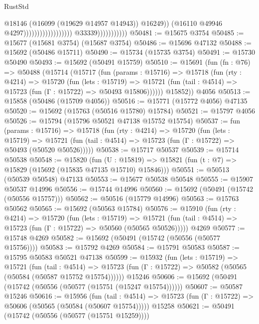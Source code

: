 \begin{lexlean}{RustStd}
\begin{coremodule}
                                                                @18146
                                                                (@16099 (@19629 @14957 @14943))
                                                                @16249))
                                                            (@16110 @49946 @4297))))))))))))))))))
                          @33339)))))))))))
@50481 := @15675 @3754
@50485 := @15677 (@15681 @3754) (@15687 @3754)
@50486 := @15696 @47132
@50488 := @15692 (@50486 @15711)
@50490 := @15734 (@15735 @3754)
@50491 := @15730 @50490
@50493 := @15692 (@50491 @15759)
@50510 := @15691
    (fun (fn : @76) =>
    @50488
      (@15714
        (@15717
          (fun (params : @15716) =>
          @15718
            (fun (rty : @4214) =>
            @15720
              (fun (lets : @15719) =>
              @15721 (fun (tail : @4514) => @15723 (fun (Γ : @15722) => @50493 @15806))))))
        @15852))
    @4056
@50513 := @15858 (@50486 (@15709 @4056))
@50516 := @15771 (@15772 @4056) @47135
@50520 := @15692 (@15763 (@50516 @15780) @15784)
@50521 := @15797 @4056
@50526 := @15794 (@15796 @50521 @47138 @15752 @15754)
@50537 := fun (params : @15716) =>
  @15718
    (fun (rty : @4214) =>
    @15720
      (fun (lets : @15719) =>
      @15721 (fun (tail : @4514) => @15723 (fun (Γ : @15722) => @50493 (@50520 @50526)))))
@50538 := @15717 @50537
@50539 := @15714 @50538
@50548 := @15820
    (fun (U : @15819) => @15821 (fun (t : @7) => @15829 (@15692 (@15835 @47135 @15710) @15846)))
@50551 := @50513 (@50539 @50548) @47133
@50553 := @15677 @50538 @50548
@50555 := @15907 @50537 @14996
@50556 := @15744 @14996
@50560 := @15692 (@50491 (@15742 (@50556 @15757)))
@50562 := @50516 (@15779 @14996)
@50563 := @15763 @50562
@50565 := @15692 (@50563 @15784)
@50576 := @15910
    (fun (rty : @4214) =>
    @15720
      (fun (lets : @15719) =>
      @15721 (fun (tail : @4514) => @15723 (fun (Γ : @15722) => @50560 (@50565 @50526)))))
    @4269
@50577 := @15748 @4269
@50582 := @15692 (@50491 (@15742 (@50556 (@50577 @15756))))
@50583 := @15792 @4269
@50584 := @15791 @50583
@50587 := @15795 @50583 @50521 @47138
@50599 := @15932
    (fun (lets : @15719) =>
    @15721
      (fun (tail : @4514) =>
      @15723 (fun (Γ : @15722) => @50582 (@50565 (@50584 (@50587 @15752 @15754))))))
    @15246
@50606 := @15692 (@50491 (@15742 (@50556 (@50577 (@15751 (@15247 @15754))))))
@50607 := @50587 @15246
@50616 := @15956
    (fun (tail : @4514) => @15723 (fun (Γ : @15722) => @50606 (@50565 (@50584 (@50607 @15754)))))
    @15258
@50621 := @50491 (@15742 (@50556 (@50577 (@15751 @15259))))

\end{coremodule}
\end{lexlean}
